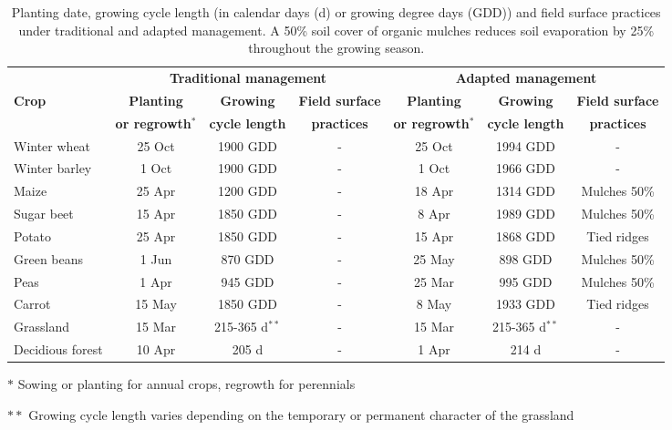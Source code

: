 \begin{landscape}
\begin{table}[htbp]
  	\caption{Planting date, growing cycle length (in calendar days (d) or growing degree days (GDD)) and field surface practices under traditional and adapted management. A 50\% soil cover of organic mulches reduces soil evaporation by 25\% throughout the growing season.}
	\begin{threeparttable}
  	\centering
\begin{tabular}{lcccccc}
\toprule
      & \multicolumn{3}{c}{\textbf{Traditional  management}} & \multicolumn{3}{c}{\textbf{Adapted management}} \\
\multicolumn{1}{l}{\multirow{2}[1]{*}{\textbf{Crop}}} & \textbf{Planting} & \textbf{Growing} & \textbf{Field surface} & \textbf{Planting} & \textbf{Growing} & \textbf{Field surface} \\
\multicolumn{1}{l}{} & \textbf{or regrowth$^\ast$} & \textbf{cycle length} & \textbf{practices} & \textbf{or regrowth$^\ast$} & \textbf{cycle length} & \textbf{practices} \\
\midrule
Winter wheat & 25 Oct & 1900 GDD & -     & 25 Oct & 1994 GDD & - \\
Winter barley & 1 Oct & 1900 GDD & -     & 1 Oct & 1966 GDD & - \\
Maize & 25 Apr & 1200 GDD & -     & 18 Apr & 1314 GDD & Mulches 50\% \\
Sugar beet & 15 Apr & 1850 GDD & -     & 8 Apr & 1989 GDD & Mulches 50\% \\
Potato & 25 Apr & 1850 GDD & -     & 15 Apr & 1868 GDD & Tied ridges \\
Green beans & 1 Jun & 870 GDD & -     & 25 May & 898 GDD & Mulches 50\% \\
Peas & 1 Apr & 945 GDD & -     & 25 Mar & 995 GDD & Mulches 50\% \\
Carrot & 15 May & 1850 GDD & -     & 8 May & 1933 GDD & Tied ridges  \\
Grassland & 15 Mar & 215-365 \si{d}$^{\ast\ast}$ & -     & 15 Mar & 215-365 \si{d}$^{\ast\ast}$ & - \\
\multicolumn{1}{l}{Decidious forest} & 10 Apr & 205 \si{d} & -     & 1 Apr & 214 \si{d} & - \\
\bottomrule
\end{tabular}%
    	\begin{tablenotes}
        \item[$\ast$] Sowing or planting for annual crops, regrowth for perennials
        \item[$\ast\ast$] Growing cycle length varies depending on the temporary or permanent character of the grassland 
    	\end{tablenotes}
        \end{threeparttable}
  \label{tab:ch6_Mgmt}%
\end{table}%
  \end{landscape}

